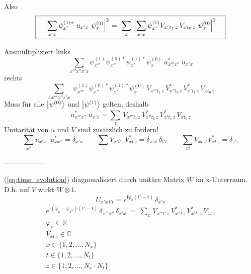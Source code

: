 \documentclass[12pt]{article}
\begin{document}
Also 
\begin{equation} 
\boxed{
\quad\Bigl| \sum_{x'x} \psi^{(1)*}_{x'}\ u_{x'x}\ \psi^{(0)}_x \Bigl|^2 
\ =\ \sum_{z}\ \Bigl|\sum_{x'x} \psi^{(1)}_{x'} V_{x't_1\, z}\, V_{xt_0\, z}\ \psi^{(0)}_{x} \Bigl|^2 \quad
}
\end{equation}

Ausmultipliziert links
\begin{equation} 
\sum_{x'''x''x'x}\psi^{(1)}_{x'''}\psi^{(0)*}_{x''}\psi^{(1)*}_{x'}\psi^{(0)}_x
\ u^*_{x'''x''}\ u_{x'x}
\end{equation}
rechts
\begin{equation} 
\sum_{z\,x'''x''x'x}\ 
\psi^{(1)}_{x'''}\psi^{(0)*}_{x''}\psi^{(1)*}_{x'}\psi^{(0)}_{x}
\, V_{x'''t_1\, z}\, V^*_{x''t_0\, z}\, V^*_{x't_1\, z}\, V_{xt_0\, z}
\end{equation}
Muss für alle $\ket{\psi^{(0)}}$ und $\ket{\psi^{(1)}}$ gelten, deshalb
\begin{equation} 
\boxed{
u^*_{x'''x''}\ u_{x'x} = \sum_z \, V_{x'''t_1\, z}\, V^*_{x''t_0\, z}\, V^*_{x't_1\, z}\, V_{xt_0\, z} 
}
\end{equation}
Unitarität von $u$ und $V$ sind zusätzlich zu fordern!
\begin{equation} 
\sum_{x''} u_{x'x''}\, u^*_{xx''} = \delta_{x'x} \quad\quad 
\sum_{z} V_{x't'\, z} V^*_{xt\, z} = \delta_{x'x}\ \delta_{t't} \quad\quad
\sum_{xt} V_{xt\, z'} V^*_{xt\, z} = \delta_{z'z}
\end{equation}

-----------------

(\ref{eq:time_evolution}) diagnonalisiert durch unitäre Matrix $W$ im x-Unterraum. D.h. auf $V$ wirkt $W \otimes \mathrm{1}$.
\begin{equation}
U_{x'x\,t't} = e^\mathrm{i\varphi_x(t'-t)}\,\delta_{x'x}
\end{equation}
\begin{equation}
\begin{split}
\boxed{
e^\mathrm{i(\varphi_x-\varphi_{x''})(t'-t)}\,\delta_{x'''x''}\,\delta_{x'x}\ =\ \sum_z \, V_{x'''t'\, z}\, V^*_{x''t\, z}\, V^*_{x't'\, z}\, V_{xt\, z} 
} \\
\varphi_x \in \mathbb{R} \\ V_{xt\, z} \in \mathbb{C} \\
x \in \{1,2,...,N_x\}\\ t \in \{1,2,...,N_t\}\\ z \in \{1,2,...,N_x \cdot N_t\} 
\end{split}
\end{equation}
\end{document}

